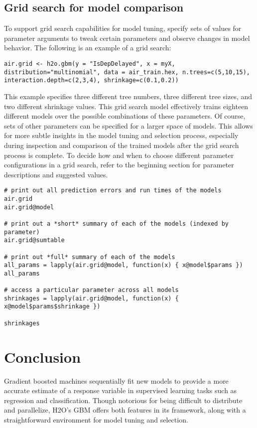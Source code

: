 {\subsection{Grid search for model comparison} 

To support grid search capabilities for model tuning,  specify sets of values for parameter arguments to tweak certain parameters and observe changes in model behavior. The following is an example of a grid search:

\begin{lstlisting}[style=R]
air.grid <- h2o.gbm(y = "IsDepDelayed", x = myX, distribution="multinomial", data = air_train.hex, n.trees=c(5,10,15), interaction.depth=c(2,3,4), shrinkage=c(0.1,0.2))
\end{lstlisting}
\noindent
This example specifies three different tree numbers, three different tree sizes, and two different shrinkage values. This grid search model effectively trains eighteen different models over the possible combinations of these parameters. Of course, sets of other parameters can be specified for a larger space of models. This allows for more subtle insights in the model tuning and selection process, especially during inspection and comparison of the trained models after the grid search process is complete. To decide how and when to choose different parameter configurations in a grid search, refer to the beginning section for parameter descriptions and suggested values.

\begin{lstlisting}[style=R]
# print out all prediction errors and run times of the models
air.grid
air.grid@model

# print out a *short* summary of each of the models (indexed by parameter)
air.grid@sumtable

# print out *full* summary of each of the models
all_params = lapply(air.grid@model, function(x) { x@model$params })
all_params

# access a particular parameter across all models
shrinkages = lapply(air.grid@model, function(x) { x@model$params$shrinkage })

shrinkages
\end{lstlisting}

\section{Conclusion}

Gradient boosted machines sequentially fit new models to provide a more accurate estimate of a response variable in supervised learning tasks such as regression and classification. Though notorious for being difficult to distribute and parallelize, H2O's GBM offers both features in its framework, along with a straightforward environment for model tuning and selection. 

}
